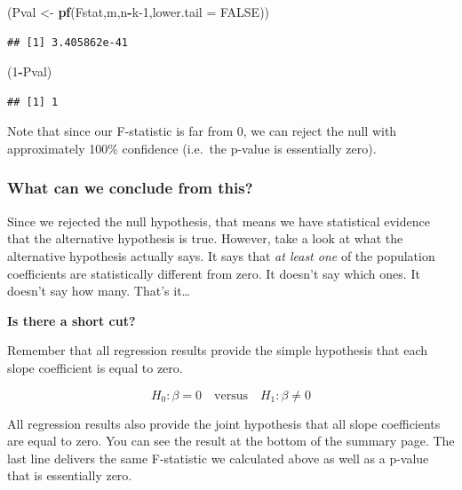 \documentclass[
]{book}
\newenvironment{Shaded}{\begin{snugshade}}{\end{snugshade}}
\newcommand{\AttributeTok}[1]{\textcolor[rgb]{0.13,0.29,0.53}{#1}}
\newcommand{\ConstantTok}[1]{\textcolor[rgb]{0.56,0.35,0.01}{#1}}
\newcommand{\DecValTok}[1]{\textcolor[rgb]{0.00,0.00,0.81}{#1}}
\newcommand{\FunctionTok}[1]{\textcolor[rgb]{0.13,0.29,0.53}{\textbf{#1}}}
\newcommand{\NormalTok}[1]{#1}
\newcommand{\OtherTok}[1]{\textcolor[rgb]{0.56,0.35,0.01}{#1}}
\newcommand{\SpecialCharTok}[1]{\textcolor[rgb]{0.81,0.36,0.00}{\textbf{#1}}}
\begin{document}
\begin{Shaded}
\begin{Highlighting}[]
\NormalTok{(Pval }\OtherTok{\textless{}{-}} \FunctionTok{pf}\NormalTok{(Fstat,m,n}\SpecialCharTok{{-}}\NormalTok{k}\DecValTok{{-}1}\NormalTok{,}\AttributeTok{lower.tail =} \ConstantTok{FALSE}\NormalTok{))}
\end{Highlighting}
\end{Shaded}

\begin{verbatim}
## [1] 3.405862e-41
\end{verbatim}

\begin{Shaded}
\begin{Highlighting}[]
\NormalTok{(}\DecValTok{1}\SpecialCharTok{{-}}\NormalTok{Pval)}
\end{Highlighting}
\end{Shaded}

\begin{verbatim}
## [1] 1
\end{verbatim}

Note that since our F-statistic is far from 0, we can reject the null with approximately 100\% confidence (i.e.~the p-value is essentially zero).

\subsubsection*{What can we conclude from this?}\label{what-can-we-conclude-from-this}

Since we rejected the null hypothesis, that means we have statistical evidence that the alternative hypothesis is true. However, take a look at what the alternative hypothesis actually says. It says that \emph{at least one} of the population coefficients are statistically different from zero. It doesn't say which ones. It doesn't say how many. That's it\ldots{}

\textbf{Is there a short cut?}

Remember that all regression results provide the simple hypothesis that each slope coefficient is equal to zero.

\[H_0: \beta=0 \quad \text{versus} \quad H_1: \beta \neq 0\]

All regression results also provide the joint hypothesis that all slope coefficients are equal to zero. You can see the result at the bottom of the summary page. The last line delivers the same F-statistic we calculated above as well as a p-value that is essentially zero.
\end{document}
